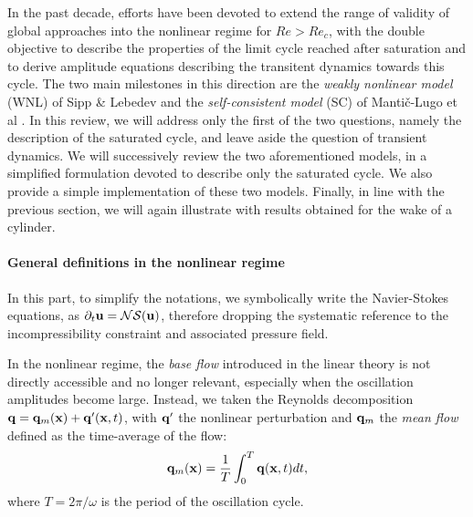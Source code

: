 \documentclass[twocolumn,10pt]{asme2ej}
\newcommand{\be}[1]{ \begin{equation} \label{#1}}
\newcommand{\ee}{\end{equation}}
\begin{document}
In the past decade, efforts have been devoted to extend the range of validity of global approaches into the nonlinear regime for $Re>Re_c$, with the double objective to describe the properties of the limit cycle reached after saturation and to derive amplitude equations describing the transitent dynamics towards this cycle. The two main milestones in this direction {\color{red} are} the {\em weakly nonlinear model}  (WNL) of Sipp \& Lebedev \cite{SippLebedev} and the {\em self-consistent model} (SC) of Manti\v{c}-Lugo et al \cite{MLugo2014}.
 {\color{blue} In this review, we will address only the first of the two questions, namely {\color{red} the} description of the saturated cycle, and leave aside the question of transient dynamics. We will successively review the two aforementioned models, in a simplified formulation devoted to describe only the saturated cycle. We also provide a simple implementation of these two models. Finally, in line with the previous section, we will again illustrate with results obtained for the wake of a cylinder.
 }
 
 

\paragraph{General definitions in the nonlinear r{\color{red}e}gime}
 
In this part, to simplify the notations, we symbolically write the Navier-Stokes equations, as {\color{red}$\partial_t {\bf u} = {\cal NS} ({\bf u})$}, therefore dropping the systematic reference to the incompressibility constraint and associated pressure field. 

In the nonlinear r{\color{red}e}gime, the {\em base flow} introduced in the linear theory is not directly accessible and no longer relevant, especially when the oscillation amplitudes become large. 
Instead, {\color{red} we taken the Reynolds decomposition ${\bf q}={\bf q}_m({\bf x})+{\bf q}'({\bf x},t)$, with ${\bf q}'$ the nonlinear perturbation and ${\bf q}_m$ the {\em mean flow} defined as the time-average  of the flow:}
\be{defumean}
{\bf q}_m({\bf x})  = \frac{1}{T} \int_0^{T}  {\bf q}({\bf x},t)  dt,
\ee
where $T = 2\pi/\omega$  is the period of the oscillation cycle.
\end{document}
